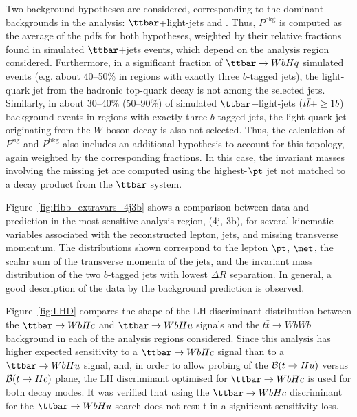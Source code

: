 Two background hypotheses are considered, corresponding to the dominant backgrounds in
the analysis: $\ttbar$+light-jets and \ttbin. Thus, $P^\textrm{bkg}$ is computed as the average of
the pdfs for both hypotheses, weighted by their relative fractions found in simulated $\ttbar$+jets events, which depend
on the analysis region considered. Furthermore, in a significant fraction of $\Hq$ simulated events (e.g. about 40--50\% in regions with exactly three $b$-tagged jets), 
the light-quark jet from the hadronic top-quark decay is not among the selected jets.
Similarly, in about 30--40\% (50--90\%) of simulated $\ttbar$+light-jets ($t\bar{t}+\geq1b$) background events in regions with exactly three $b$-tagged jets, 
the light-quark jet originating from the $W$ boson decay is also not selected. Thus, the calculation of $P^\textrm{sig}$ and
$P^\textrm{bkg}$ also includes an additional hypothesis to account for this topology, again weighted by the corresponding fractions. 
In this case, the invariant masses involving the missing jet are computed using the highest-$\pt$ jet not matched 
to a decay product from the $\ttbar$ system.


Figure~\ref{fig:Hbb_extravars_4j3b} shows a comparison between data and prediction in the most sensitive analysis region, (4j, 3b), 
for several kinematic variables associated with the reconstructed lepton, jets, and missing transverse momentum. 
The distributions shown correspond to the lepton $\pt$, $\met$, the scalar sum of the transverse momenta of 
the jets, and the invariant mass distribution of the two $b$-tagged jets with lowest $\Delta R$ separation.
In general, a good description of the data by the background prediction is observed.

Figure~\ref{fig:LHD} compares the shape of the LH discriminant distribution between the $\Hc$ and $\Hu$ signals and the 
$t\bar{t}\to WbWb$ background in each of the analysis regions considered.
Since this analysis has higher expected sensitivity to a $\Hc$ signal than to a $\Hu$ signal, and, in order to allow probing 
of the $\mathcal{B}(t\to Hu)$ versus $\mathcal{B}(t\to Hc)$ plane, the LH discriminant optimised for $\Hc$ is used for both 
decay modes. It was verified that using the $\Hc$ discriminant for the $\Hu$ search does not result in a significant sensitivity loss.

